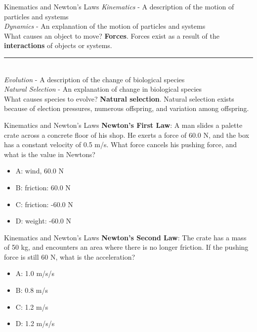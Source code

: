 \documentclass{beamer}
\begin{document}
\begin{frame}{Kinematics and Newton's Laws}
\small
\textit{Kinematics} - A \alert{description} of the motion of particles and systems \\
\textit{Dynamics} - An \alert{explanation} of the motion of particles and systems \\
\vspace{0.25cm}
What causes an object to move?  \textbf{Forces}.  Forces exist as a result of the \alert{\textbf{interactions}} of objects or systems.\\
\vspace{0.25cm}
\rule{10cm}{0.4pt} \\
\vspace{0.25cm}
\textit{Evolution} - A \alert{description} of the change of biological species \\
\textit{Natural Selection} - An \alert{explanation} of change in biological species \\
\vspace{0.25cm}
What causes species to evolve?  \textbf{Natural selection}.  Natural selection exists because of \alert{election pressures}, \alert{numerous offspring}, and \alert{variation} among offspring.
\end{frame}

\begin{frame}{Kinematics and Newton's Laws}
\textbf{Newton's First Law}: A man slides a palette crate across a concrete floor of his shop.  He exerts a force of 60.0 N, and the box has a constant velocity of 0.5 m/s.  What force cancels his pushing force, and what is the value in Newtons?
\begin{itemize}
\item A: wind, 60.0 N
\item B: friction: 60.0 N
\item C: friction: -60.0 N
\item D: weight: -60.0 N
\end{itemize}
\end{frame}

\begin{frame}{Kinematics and Newton's Laws}
\textbf{Newton's Second Law}: The crate has a mass of 50 kg, and encounters an area where there is no longer friction.  If the pushing force is still 60 N, what is the acceleration?
\begin{itemize}
\item A: 1.0 m/s/s
\item B: 0.8 m/s
\item C: 1.2 m/s
\item D: 1.2 m/s/s
\end{itemize}
\end{frame}
\end{document}
